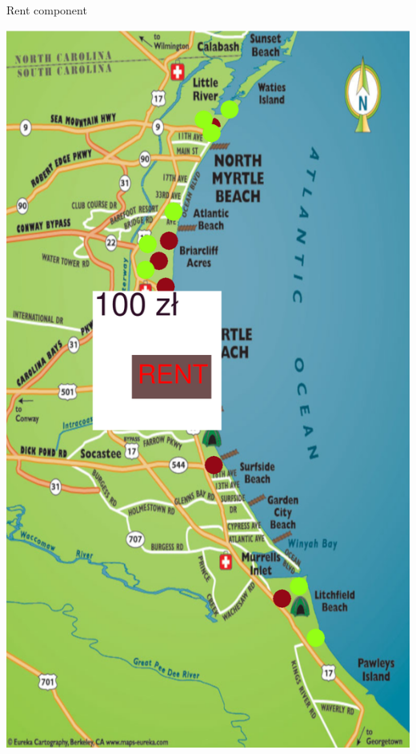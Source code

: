 \documentclass[14pt]{extarticle}
\begin{document}
\begin{minipage}{\textwidth}

{\huge Rent component}

\includegraphics[width=\textwidth]{mock2.png}

\end{minipage}
\end{document}
